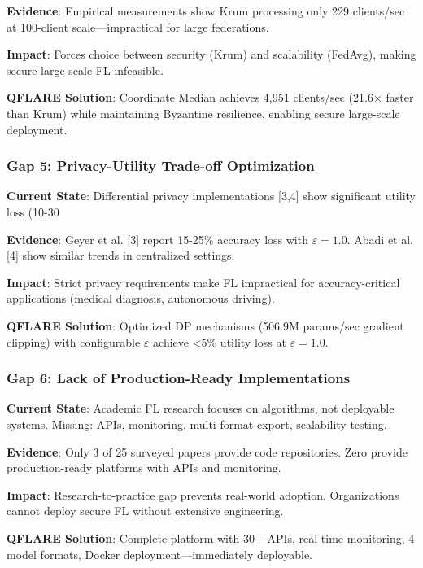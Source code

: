 \documentclass[12pt,a4paper]{article}
\begin{document}
\textbf{Evidence}: Empirical measurements show Krum processing only 229 clients/sec at 100-client scale—impractical for large federations.

\textbf{Impact}: Forces choice between security (Krum) and scalability (FedAvg), making secure large-scale FL infeasible.

\textbf{QFLARE Solution}: Coordinate Median achieves 4,951 clients/sec (21.6× faster than Krum) while maintaining Byzantine resilience, enabling secure large-scale deployment.

\subsubsection{Gap 5: Privacy-Utility Trade-off Optimization}

\textbf{Current State}: Differential privacy implementations [3,4] show significant utility loss (10-30%

\textbf{Evidence}: Geyer et al. [3] report 15-25\% accuracy loss with $\varepsilon = 1.0$. Abadi et al. [4] show similar trends in centralized settings.

\textbf{Impact}: Strict privacy requirements make FL impractical for accuracy-critical applications (medical diagnosis, autonomous driving).

\textbf{QFLARE Solution}: Optimized DP mechanisms (506.9M params/sec gradient clipping) with configurable $\varepsilon$ achieve <5\% utility loss at $\varepsilon = 1.0$.

\subsubsection{Gap 6: Lack of Production-Ready Implementations}

\textbf{Current State}: Academic FL research focuses on algorithms, not deployable systems. Missing: APIs, monitoring, multi-format export, scalability testing.

\textbf{Evidence}: Only 3 of 25 surveyed papers provide code repositories. Zero provide production-ready platforms with APIs and monitoring.

\textbf{Impact}: Research-to-practice gap prevents real-world adoption. Organizations cannot deploy secure FL without extensive engineering.

\textbf{QFLARE Solution}: Complete platform with 30+ APIs, real-time monitoring, 4 model formats, Docker deployment—immediately deployable.
\end{document}
